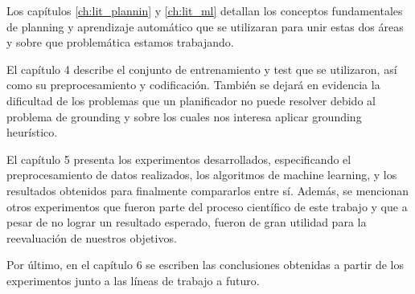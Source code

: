 Los capítulos \ref{ch:lit_plannin} y \ref{ch:lit_ml} detallan los conceptos
fundamentales de planning y aprendizaje automático que se utilizaran para unir
estas dos áreas y sobre que problemática estamos trabajando.

El capítulo 4 describe el conjunto de entrenamiento y test que se utilizaron,
así como su preprocesamiento y codificación. También se dejará en evidencia la
dificultad de los problemas que un planificador no puede resolver debido al
problema de grounding y sobre los cuales nos interesa aplicar grounding
heurístico.

El capítulo 5 presenta los experimentos desarrollados, especificando el
preprocesamiento de datos realizados, los algoritmos de machine learning, y los
resultados obtenidos para finalmente compararlos entre sí. Además, se mencionan
otros experimentos que fueron parte del proceso científico de este trabajo y que
a pesar de no lograr un resultado esperado, fueron de gran utilidad para la
reevaluación de nuestros objetivos.

Por último, en el capítulo 6 se escriben las conclusiones obtenidas a partir de
los experimentos junto a las líneas de trabajo a futuro.